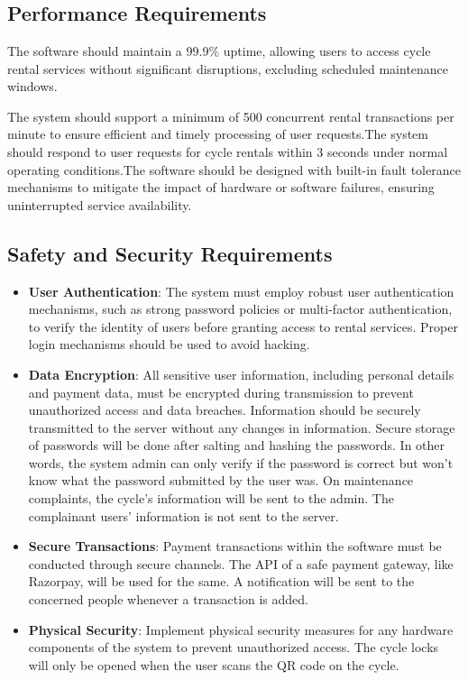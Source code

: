 \documentclass[11pt]{article}
\begin{document}
\newpage
\section{}
\subsection{Performance Requirements}
The software should maintain a 99.9\% uptime, allowing users to access cycle rental services without significant disruptions, excluding scheduled maintenance windows.

The system should support a minimum of 500 concurrent rental transactions per minute to ensure efficient and timely processing of user requests.The system should respond to user requests for cycle rentals within 3 seconds under normal operating conditions.The software should be designed with built-in fault tolerance mechanisms to mitigate the impact of hardware or software failures, ensuring uninterrupted service availability.

\subsection{Safety and Security Requirements}
\begin{itemize}
    \item \textbf{User Authentication}: The system must employ robust user authentication mechanisms, such as strong password policies or multi-factor authentication, to verify the identity of users before granting access to rental services. Proper login mechanisms should be used to avoid hacking.
    \item \textbf{Data Encryption}: All sensitive user information, including personal details and payment data, must be encrypted during transmission to prevent unauthorized access and data breaches. Information should be securely transmitted to the server without any changes in information. Secure storage of passwords will be done after salting and hashing the passwords. In other words, the system admin can only verify if the password is correct but won’t know what the password submitted by the user was. On maintenance complaints, the cycle’s information will be sent to the admin. The complainant users’ information is not sent to the server.
    \item \textbf{Secure Transactions}: Payment transactions within the software must be conducted through secure channels. The API of a safe payment gateway, like Razorpay, will be used for the same. A notification will be sent to the concerned people whenever a transaction is added.
    \item \textbf{Physical Security}: Implement physical security measures for any hardware components of the system to prevent unauthorized access. The cycle locks will only be opened when the user scans the QR code on the cycle.
\end{itemize}
\end{document}
